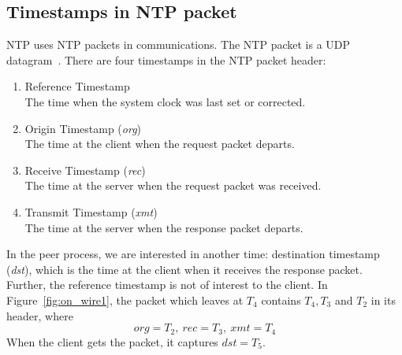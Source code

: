 \subsection{Timestamps in NTP packet}%
\label{sub:timestamps_in_ntp_packet}
NTP uses NTP packets in communications. The NTP packet is a UDP
datagram~\cite{rfc5905}. There are four timestamps in the NTP packet header:
\begin{enumerate}
    \item Reference Timestamp\\
        The time when the system clock was last set or corrected.
    \item Origin Timestamp (\emph{org})\\
        The time at the client when the request packet departs.
    \item Receive Timestamp (\emph{rec})\\
        The time at the server when the request packet was received.
    \item Transmit Timestamp (\emph{xmt})\\
        The time at the server when the response packet departs.
\end{enumerate}
In the peer process, we are interested in another time: destination
timestamp (\emph{dst}), which is the time at the client when it receives the
response packet. Further, the reference timestamp is not of interest to the
client. In Figure~\ref{fig:on_wire1}, the packet which leaves at $T_4$ contains
$T_4, T_3$ and $T_2$ in its header, where
$$ \textit{org} = T_2,~\textit{rec} = T_3,~\textit{xmt} = T_4 $$
When the client gets the packet, it captures $\textit{dst} = T_5$.

